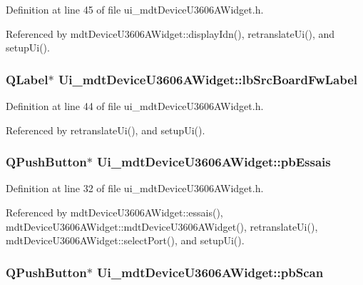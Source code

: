 Definition at line 45 of file ui\-\_\-mdt\-Device\-U3606\-A\-Widget.\-h.



Referenced by mdt\-Device\-U3606\-A\-Widget\-::display\-Idn(), retranslate\-Ui(), and setup\-Ui().

\hypertarget{class_ui__mdt_device_u3606_a_widget_a9e876113b12bbbd2b43a0e057ad577d0}{
\subsubsection[{lb\-Src\-Board\-Fw\-Label}]{\setlength{\rightskip}{0pt plus 5cm}Q\-Label$\ast$ Ui\-\_\-mdt\-Device\-U3606\-A\-Widget\-::lb\-Src\-Board\-Fw\-Label}}\label{class_ui__mdt_device_u3606_a_widget_a9e876113b12bbbd2b43a0e057ad577d0}


Definition at line 44 of file ui\-\_\-mdt\-Device\-U3606\-A\-Widget.\-h.



Referenced by retranslate\-Ui(), and setup\-Ui().

\hypertarget{class_ui__mdt_device_u3606_a_widget_a1e9e1ea2fdd310f5053c7e8833eb57ee}{
\subsubsection[{pb\-Essais}]{\setlength{\rightskip}{0pt plus 5cm}Q\-Push\-Button$\ast$ Ui\-\_\-mdt\-Device\-U3606\-A\-Widget\-::pb\-Essais}}\label{class_ui__mdt_device_u3606_a_widget_a1e9e1ea2fdd310f5053c7e8833eb57ee}


Definition at line 32 of file ui\-\_\-mdt\-Device\-U3606\-A\-Widget.\-h.



Referenced by mdt\-Device\-U3606\-A\-Widget\-::essais(), mdt\-Device\-U3606\-A\-Widget\-::mdt\-Device\-U3606\-A\-Widget(), retranslate\-Ui(), mdt\-Device\-U3606\-A\-Widget\-::select\-Port(), and setup\-Ui().

\hypertarget{class_ui__mdt_device_u3606_a_widget_ab0c0a93358a9d07107fbbce8c82bb9f1}{
\subsubsection[{pb\-Scan}]{\setlength{\rightskip}{0pt plus 5cm}Q\-Push\-Button$\ast$ Ui\-\_\-mdt\-Device\-U3606\-A\-Widget\-::pb\-Scan}}\label{class_ui__mdt_device_u3606_a_widget_ab0c0a93358a9d07107fbbce8c82bb9f1}


